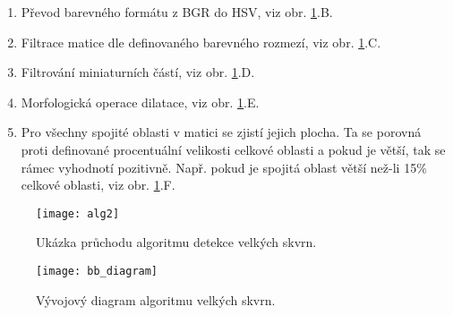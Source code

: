 \begin{enumerate}
	\item Převod barevného formátu z BGR do HSV, viz obr. \ref{fig:alg_2}.B.
	\item Filtrace matice dle definovaného barevného rozmezí, viz obr. \ref{fig:alg_2}.C.
	\item Filtrování miniaturních částí, viz obr. \ref{fig:alg_2}.D.
	\item Morfologická operace dilatace, viz obr. \ref{fig:alg_2}.E.
	\item Pro všechny spojité oblasti v matici se zjistí jejich plocha. Ta se porovná proti definované procentuální velikosti celkové oblasti a pokud je větší, tak se rámec vyhodnotí pozitivně. Např. pokud je spojitá oblast větší než-li 15\% celkové oblasti, viz obr. \ref{fig:alg_2}.F.
\end{enumerate} 

\begin{figure}[h]
	\texttt{[image: alg2]}
	\centering
	\caption{Ukázka průchodu algoritmu detekce velkých skvrn. \label{fig:alg_2}}
\end{figure} 


\begin{figure}[h]
	\texttt{[image: bb\_diagram]}
	\centering
	\caption{Vývojový diagram algoritmu velkých skvrn. \label{fig:bb_diagram}}
\end{figure} 